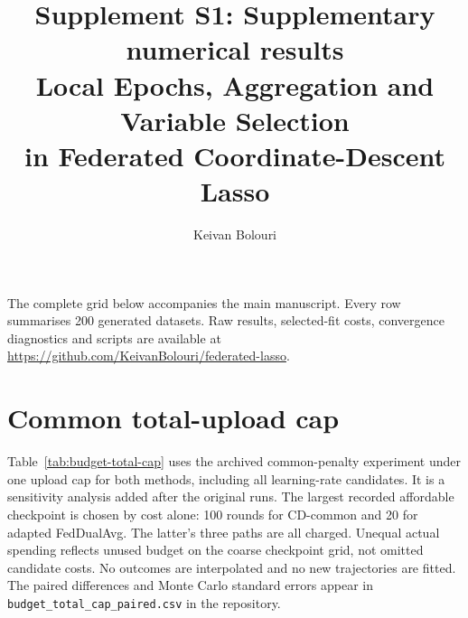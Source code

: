 \documentclass[10pt]{article}
\title{Supplement S1: Supplementary numerical results\\[4pt]\large Local Epochs, Aggregation and Variable Selection\\in Federated Coordinate-Descent Lasso}
\author{Keivan Bolouri}
\date{}
\begin{document}
\maketitle
\noindent The complete grid below accompanies the main manuscript. Every row
summarises 200 generated datasets. Raw results, selected-fit costs,
convergence diagnostics and scripts are available at
\url{https://github.com/KeivanBolouri/federated-lasso}.

\clearpage
\section*{Common total-upload cap}
Table~\ref{tab:budget-total-cap} uses the archived common-penalty experiment
under one upload cap for both methods, including all learning-rate
candidates. It is a sensitivity analysis added after the original runs.
The largest recorded affordable checkpoint is chosen by cost alone:
100 rounds for CD-common and 20 for adapted FedDualAvg. The latter's
three paths are all charged. Unequal actual spending reflects unused
budget on the coarse checkpoint grid, not omitted candidate costs.
No outcomes are interpolated and no new trajectories are fitted.
The paired differences and Monte Carlo standard errors appear in
\texttt{budget\_total\_cap\_paired.csv} in the repository.

\clearpage

\end{document}
